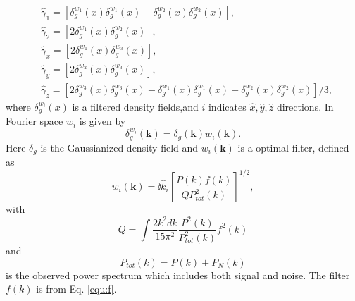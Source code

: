\begin{equation}
\label{equ:gamma}
\begin{split}
&\hat{\gamma}_{1}=\left[\delta^{w_{1}}_{g}(x)\delta^{w_{1}}_{g}(x)-\delta^{w_{2}}_{g}(x)\delta^{w_{2}}_{g}(x) \right],\\
&\hat{\gamma}_{2}=[2\delta^{w_{1}}_{g}(x)\delta^{w_{2}}_{g}(x)],\\
&\hat{\gamma}_{x}=[2\delta^{w_{1}}_{g}(x)\delta^{w_{3}}_{g}(x)],\\
&\hat{\gamma}_{y}=[2\delta^{w_{2}}_{g}(x)\delta^{w_{3}}_{g}(x)],\\
&\hat{\gamma}_{z}=[2\delta^{w_{3}}_{g}(x)\delta^{w_{3}}_{g}(x)
-\delta^{w_{1}}_{g}(x)\delta^{w_{1}}_{g}(x)
-\delta^{w_{2}}_{g}(x)\delta^{w_{2}}_{g}(x)]/3,
\end{split}
\end{equation}
where $\delta^{w_{i}}_{g}(x)$ is a filtered density fields,and $i$ indicates $\hat{x},\hat{y},\hat{z}$ directions. In Fourier space $w_{i}$ is given by
\begin{equation}
\delta^{w_{i}}_{g}(\mathbf{k})=\delta_{g}(\mathbf{k})w_{i}(\mathbf{k}).
\end{equation}
Here $\delta_{g}$ is the Gaussianized density field and $w_{i}(\mathbf{k})$ is a optimal filter, defined as 
\begin{equation}
w_{i}(\mathbf{k})=\ii \hat{k}_{i} \left[\frac{P(k)f(k)}{QP^{2}_{tot}(k)}\right]^{1/2},
\label{equ:w}
\end{equation}
with 
\begin{equation}
Q=\int \frac{2k^{2}dk}{15\pi^{2}}\frac{P^{2}(k)}{P^{2}_{tot}(k)}f^{2}(k)
\label{equ:Q}
\end{equation}
and
\begin{equation}
P_{tot}(k)=P(k)+P_{N}(k)
 \end{equation}
 is the observed power spectrum which includes both signal and noise. The filter $f(k)$ is from Eq. \eqref{equ:f}.\\
 
